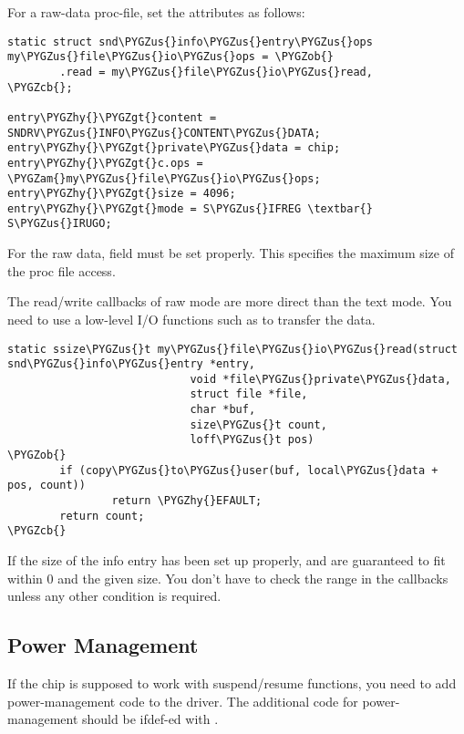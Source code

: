 \documentclass[a4paper,8pt,english]{sphinxmanual}
\def\PYGZus{\char`\_}
\def\PYGZob{\char`\{}
\def\PYGZcb{\char`\}}
\def\PYGZam{\char`\&}
\def\PYGZgt{\char`\>}
\def\PYGZhy{\char`\-}
\begin{document}
For a raw-data proc-file, set the attributes as follows:

\begin{Verbatim}[commandchars=\\\{\}]
static struct snd\PYGZus{}info\PYGZus{}entry\PYGZus{}ops my\PYGZus{}file\PYGZus{}io\PYGZus{}ops = \PYGZob{}
        .read = my\PYGZus{}file\PYGZus{}io\PYGZus{}read,
\PYGZcb{};

entry\PYGZhy{}\PYGZgt{}content = SNDRV\PYGZus{}INFO\PYGZus{}CONTENT\PYGZus{}DATA;
entry\PYGZhy{}\PYGZgt{}private\PYGZus{}data = chip;
entry\PYGZhy{}\PYGZgt{}c.ops = \PYGZam{}my\PYGZus{}file\PYGZus{}io\PYGZus{}ops;
entry\PYGZhy{}\PYGZgt{}size = 4096;
entry\PYGZhy{}\PYGZgt{}mode = S\PYGZus{}IFREG \textbar{} S\PYGZus{}IRUGO;
\end{Verbatim}

For the raw data,  field must be set properly. This specifies
the maximum size of the proc file access.

The read/write callbacks of raw mode are more direct than the text mode.
You need to use a low-level I/O functions such as
 to transfer the data.

\begin{Verbatim}[commandchars=\\\{\}]
static ssize\PYGZus{}t my\PYGZus{}file\PYGZus{}io\PYGZus{}read(struct snd\PYGZus{}info\PYGZus{}entry *entry,
                            void *file\PYGZus{}private\PYGZus{}data,
                            struct file *file,
                            char *buf,
                            size\PYGZus{}t count,
                            loff\PYGZus{}t pos)
\PYGZob{}
        if (copy\PYGZus{}to\PYGZus{}user(buf, local\PYGZus{}data + pos, count))
                return \PYGZhy{}EFAULT;
        return count;
\PYGZcb{}
\end{Verbatim}

If the size of the info entry has been set up properly,  and
 are guaranteed to fit within 0 and the given size. You don't
have to check the range in the callbacks unless any other condition is
required.


\subsection{Power Management}
\label{sound/kernel-api/writing-an-alsa-driver:power-management}
If the chip is supposed to work with suspend/resume functions, you need
to add power-management code to the driver. The additional code for
power-management should be ifdef-ed with .
\end{document}
